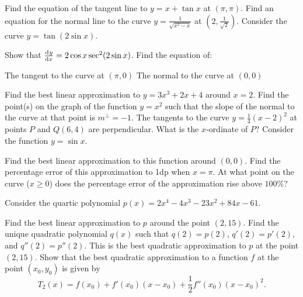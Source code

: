 \begin{questions}
  \questioM Find the equation of the tangent line to $ y = x + \tan x $ at $ (\pi, \pi) $.
  \questioM Find an equation for the normal line to the curve $ y = \frac{1}{\sqrt{x^2 - x}} $ at $ (2, \frac{1}{\sqrt{2}}) $.
  \question Consider the curve $ y = \tan(2\sin x) $.
    \begin{parts}
      \parA Show that $ \od{y}{x} = 2\cos x \sec^2 (2 \sin x) $.
      \parM Find the equation of:
        \begin{subparts}
          \subpart The tangent to the curve at $ (\pi, 0) $
          \subpart The normal to the curve at $ (0, 0) $
        \end{subparts}
    \end{parts}
  \questioM Find the best linear approximation to $ y = 3x^3 + 2x + 4 $ around $ x = 2 $.
  \questioM Find the point(s) on the graph of the function $ y = x^2 $ such that the slope of the normal to the curve at that point is $ m^\perp = -1 $.
  \questioE The tangents to the curve $ y = \frac{1}{4}(x - 2)^2 $ at points $ P $ and $ Q(6,4) $ are perpendicular. What is the $ x$-ordinate of $ P $?
  \question Consider the function $ y = \sin x $.
    \begin{parts}
      \parM Find the best linear approximation to this function around $ (0,0) $.
      \parM Find the percentage error of this approximation to 1dp when $ x = \pi $.
      \parE At what point on the curve ($ x \geq 0 $) does the percentage error of the approximation rise above $ 100\% $?
    \end{parts}
  \question Consider the quartic polynomial $ p(x) = 2x^4 -4x^3 - 23x^2 + 84x - 61 $.
    \begin{parts}
      \parM Find the best linear approximation to $ p $ around the point $ (2, 15) $.
      \parS Find the unique quadratic polynomial $ q(x) $ such that $ q(2) = p(2) $, $ q'(2) = p'(2) $, and $ q''(2) = p''(2) $.
            This is the best quadratic approximation to $ p $ at the point $ (2, 15) $.
      \parO Show that the best quadratic approximation to a function $ f $ at the point $ (x_0, y_0) $ is given by
            \begin{displaymath}
              T_2(x) = f(x_0) + f'(x_0) (x - x_0) + \frac{1}{2} f''(x_0) (x - x_0)^2.
            \end{displaymath}
    \end{parts}
\end{questions}

